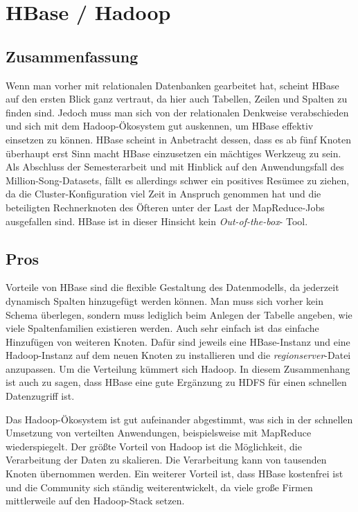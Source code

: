 \section{HBase / Hadoop}
\subsection{Zusammenfassung}
Wenn man vorher mit relationalen Datenbanken gearbeitet hat, scheint HBase auf den ersten Blick ganz vertraut, da hier auch Tabellen, Zeilen und Spalten zu finden sind. Jedoch muss man sich von der relationalen Denkweise verabschieden und sich mit dem Hadoop-Ökosystem gut auskennen, um HBase effektiv einsetzen zu können. HBase scheint in Anbetracht dessen, dass es ab fünf Knoten überhaupt erst Sinn macht HBase einzusetzen ein mächtiges Werkzeug zu sein. Als Abschluss der Semesterarbeit und mit Hinblick auf den Anwendungsfall des Million-Song-Datasets, fällt es allerdings schwer ein positives Resümee zu ziehen, da die Cluster-Konfiguration viel Zeit in Anspruch genommen hat und die beteiligten Rechnerknoten des Öfteren unter der Last der MapReduce-Jobs ausgefallen sind. HBase ist in dieser Hinsicht kein \textit{Out-of-the-box}- Tool.

\subsection{Pros}
Vorteile von HBase sind die flexible Gestaltung des Datenmodells, da jederzeit dynamisch Spalten hinzugefügt werden können. Man muss sich vorher kein Schema überlegen, sondern muss lediglich beim Anlegen der Tabelle angeben, wie viele Spaltenfamilien existieren werden. Auch sehr einfach ist das einfache Hinzufügen von weiteren Knoten. Dafür sind jeweils eine HBase-Instanz und eine Hadoop-Instanz auf dem neuen Knoten zu installieren und die \textit{regionserver}-Datei anzupassen. Um die Verteilung kümmert sich Hadoop. In diesem Zusammenhang ist auch zu sagen, dass HBase eine gute Ergänzung zu \ac{HDFS} für einen schnellen Datenzugriff ist.

Das Hadoop-Ökosystem ist gut aufeinander abgestimmt, was sich in der schnellen Umsetzung von verteilten Anwendungen, beispielsweise mit MapReduce wiederspiegelt.
Der größte Vorteil von Hadoop ist die Möglichkeit, die Verarbeitung der Daten zu skalieren. Die Verarbeitung kann von tausenden Knoten übernommen werden. Ein weiterer Vorteil ist, dass HBase kostenfrei ist und die Community sich ständig weiterentwickelt, da viele große Firmen mittlerweile auf den Hadoop-Stack setzen. 


